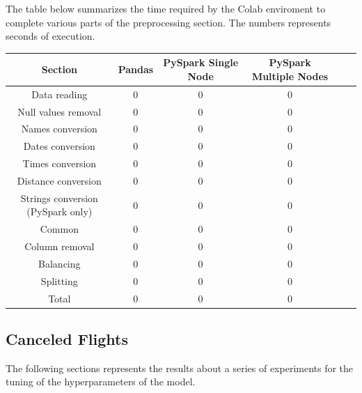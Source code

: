 \documentclass[
	letterpaper, %
	10pt, %
]{class}
\begin{document}
The table below summarizes the time required by the Colab enviroment to complete various parts of the preprocessing section.
The numbers represents seconds of execution.

\begin{center}
    \begin{tabular}{ |c|c|c|c|c|c| }
        \hline
        Section        & Pandas & PySpark Single Node & PySpark Multiple Nodes \\
        \hline
        Data reading   & 0      & 0                   & 0                      \\
        Null values removal         & 0      & 0                   & 0                      \\
        Names conversion         & 0      & 0                   & 0                      \\
        Dates conversion         & 0      & 0                   & 0                      \\
        Times conversion         & 0      & 0                   & 0                      \\
        Distance conversion         & 0      & 0                   & 0                      \\
        Strings conversion (PySpark only)         & 0      & 0                   & 0                      \\
        Common         & 0      & 0                   & 0                      \\
        Column removal & 0      & 0                   & 0                      \\
        Balancing      & 0      & 0                   & 0                      \\
        Splitting      & 0      & 0                   & 0                      \\
        Total          & 0      & 0                   & 0                      \\

        \hline
    \end{tabular}
\end{center}


\subsection{Canceled Flights}

The following sections represents the results about a series of experiments for the tuning of the hyperparameters of the model.
\end{document}
